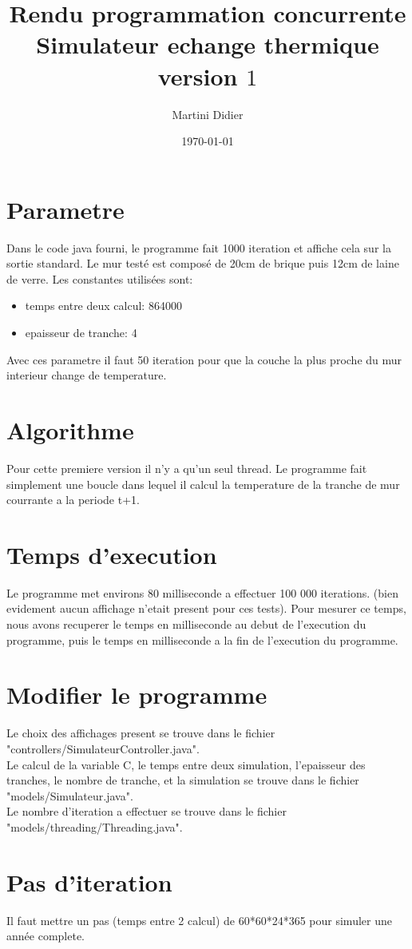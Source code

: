 \documentclass[11pt,a4paper,titlepage]{article}
\title{\blue Rendu programmation concurrente \\
\blueb Simulateur echange thermique version $1$}
\author{Martini Didier}
\date{\today}
\begin{document}
\maketitle

\section{Parametre}
Dans le code java fourni, le programme fait 1000 iteration et affiche cela sur la sortie standard. 
Le mur testé est composé de 20cm de brique puis 12cm de laine de verre.
Les constantes utilisées sont:\\ 
\begin{itemize}
\item temps entre deux calcul: 864000
\item epaisseur de tranche: 4
\end{itemize}
Avec ces parametre il faut 50 iteration pour que la couche la plus proche du mur interieur change de temperature.\\

\section{Algorithme}
Pour cette premiere version il n'y a qu'un seul thread.
Le programme fait simplement une boucle dans lequel il calcul la temperature de la tranche de mur courrante a la periode t+1.

\section{Temps d'execution}
Le programme met environs 80 milliseconde a effectuer 100 000 iterations. (bien evidement aucun affichage n'etait present pour ces tests).
Pour mesurer ce temps, nous avons recuperer le temps en milliseconde au debut de l'execution du programme, 
puis le temps en milliseconde a la fin de l'execution du programme.

\section{Modifier le programme}
Le choix des affichages present se trouve dans le fichier "controllers/SimulateurController.java".\\
Le calcul de la variable C, le temps entre deux simulation, l'epaisseur des tranches, le nombre de tranche, et la simulation se trouve dans le fichier "models/Simulateur.java".\\
Le nombre d'iteration a effectuer se trouve dans le fichier "models/threading/Threading.java".\\

\section{Pas d'iteration}
Il faut mettre un pas (temps entre 2 calcul) de 60*60*24*365 pour simuler une année complete.\\
\end{document}
